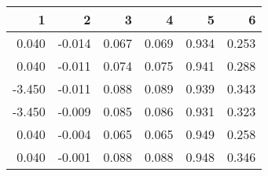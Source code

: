 \begin{table}[ht]
\centering
\begin{tabular}{rrrrrr}
  \hline
1 & 2 & 3 & 4 & 5 & 6 \\ 
  \hline
0.040 & -0.014 & 0.067 & 0.069 & 0.934 & 0.253 \\ 
  0.040 & -0.011 & 0.074 & 0.075 & 0.941 & 0.288 \\ 
  -3.450 & -0.011 & 0.088 & 0.089 & 0.939 & 0.343 \\ 
  -3.450 & -0.009 & 0.085 & 0.086 & 0.931 & 0.323 \\ 
  0.040 & -0.004 & 0.065 & 0.065 & 0.949 & 0.258 \\ 
  0.040 & -0.001 & 0.088 & 0.088 & 0.948 & 0.346 \\ 
   \hline
\end{tabular}
\end{table}
